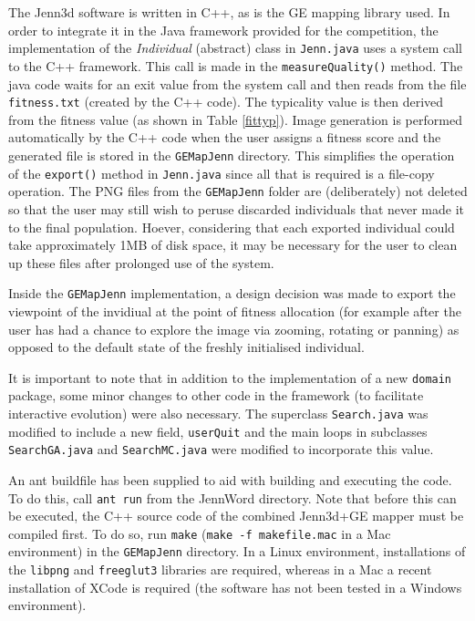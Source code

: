 \documentclass{article}
\begin{document}
The Jenn3d software is written in C++, as is the GE mapping library used. In
order to integrate it in the Java framework provided for the competition, the
implementation of the \textit{Individual} (abstract) class in \texttt{Jenn.java} uses 
a system call to the C++ framework. This call is made in the \texttt{measureQuality()} 
method. The java code waits for an exit value from the system call and then reads 
from the file \texttt{fitness.txt} (created by the C++ code). The typicality value is then 
derived from the fitness value (as shown in Table \ref{fittyp}). Image generation is 
performed automatically by the C++ code when the user assigns a fitness score and the generated
file is stored in the \texttt{GEMapJenn} directory. This simplifies the operation of the
\texttt{export()} method in \texttt{Jenn.java} since all that is required is a file-copy
operation. The PNG files from the \texttt{GEMapJenn} folder are (deliberately) not deleted so 
that the user may still wish to peruse discarded individuals that never made it to the final population.
Hoever, considering that each exported individual could take approximately 1MB of disk space, it 
may be necessary for the user to clean up these files after prolonged use of the system.

Inside the \texttt{GEMapJenn} implementation, a design decision was made to export the viewpoint of
the invidiual at the point of fitness allocation (for example after the user has had a chance to 
explore the image via zooming, rotating or panning) as opposed to the default state of the freshly
initialised individual.

It is important to note that in addition to the implementation of a new \texttt{domain} 
package, some minor changes to other code in the framework (to facilitate interactive evolution)
were also necessary. The superclass \texttt{Search.java} was modified to include a new field, 
\texttt{userQuit} and the main loops in subclasses \texttt{SearchGA.java} and \texttt{SearchMC.java} 
were modified to incorporate this value.

An ant buildfile has been supplied to aid with building and executing the code. To do this, call 
\texttt{ant run} from the JennWord directory. Note that before this can be executed, the 
C++ source code of the combined Jenn3d+GE mapper must be compiled first. To do
so, run \texttt{make} (\texttt{make -f makefile.mac} in a Mac environment) in
the \texttt{GEMapJenn} directory. In a Linux environment, installations of
the \texttt{libpng} and \texttt{freeglut3} libraries are required, whereas in a Mac 
a recent installation of XCode is required (the software has not been tested in a 
Windows environment).
\end{document}
